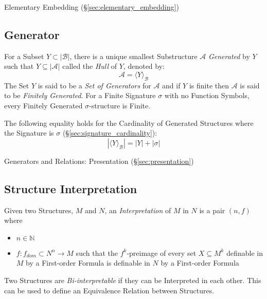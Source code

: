 Elementary Embedding (\S\ref{sec:elementary_embedding})



\subsection{Generator}\label{sec:generator}

For a Subset $Y \subset |\mathcal{B}|$, there is a unique smallest
Substructure $\mathcal{A}$ \emph{Generated} by $Y$ such that $Y
\subseteq |\mathcal{A}|$ called the \emph{Hull} of $Y$, denoted by:
\[
  \mathcal{A} = \langle Y \rangle_\mathcal{B}
\]
The Set $Y$ is said to be a \emph{Set of Generators} for $\mathcal{A}$
and if $Y$ is finite then $\mathcal{A}$ is said to be \emph{Finitely
  Generated}. For a Finite Signature $\sigma$ with no Function
Symbols, every Finitely Generated $\sigma$-structure is Finite.

The following equality holds for the Cardinality of Generated
Structures where the Signature is $\sigma$
(\S\ref{sec:signature_cardinality}):
\[
  |\langle Y \rangle_\mathcal{B}| = |Y| + |\sigma|
\]

Generators and Relations: Presentation (\S\ref{sec:presentation})



\subsection{Structure Interpretation}
\label{sec:structure_interpretation}

Given two Structures, $M$ and $N$, an \emph{Interpretation} of $M$ in
$N$ is a pair $(n,f)$ where
\begin{itemize}
  \item $n \in \mathbb{N}$
  \item $f:f_{dom} \subset N^n \rightarrow M$ such that the
    $f^k$-preimage of every set $X \subseteq M^k$ definable in $M$ by
    a First-order Formula is definable in $N$ by a First-order Formula
\end{itemize}

Two Structures are \emph{Bi-interpretable} if they can be Interpreted
in each other. This can be used to define an Equivalence Relation
between Structures.


